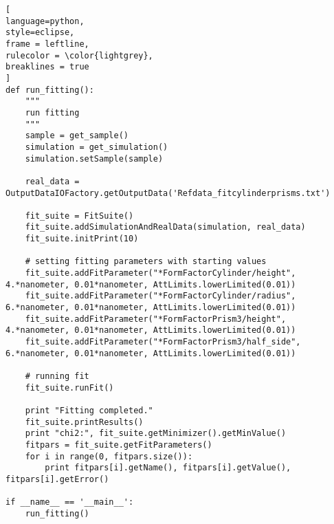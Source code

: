 \begin{lstlisting}[
language=python, 
style=eclipse, 
frame = leftline, 
rulecolor = \color{lightgrey},
breaklines = true
]
def run_fitting():
    """
    run fitting
    """
    sample = get_sample()
    simulation = get_simulation()
    simulation.setSample(sample)

    real_data = OutputDataIOFactory.getOutputData('Refdata_fitcylinderprisms.txt')
    
    fit_suite = FitSuite()
    fit_suite.addSimulationAndRealData(simulation, real_data)
    fit_suite.initPrint(10)

    # setting fitting parameters with starting values
    fit_suite.addFitParameter("*FormFactorCylinder/height", 4.*nanometer, 0.01*nanometer, AttLimits.lowerLimited(0.01))
    fit_suite.addFitParameter("*FormFactorCylinder/radius", 6.*nanometer, 0.01*nanometer, AttLimits.lowerLimited(0.01))
    fit_suite.addFitParameter("*FormFactorPrism3/height", 4.*nanometer, 0.01*nanometer, AttLimits.lowerLimited(0.01))
    fit_suite.addFitParameter("*FormFactorPrism3/half_side", 6.*nanometer, 0.01*nanometer, AttLimits.lowerLimited(0.01))

    # running fit
    fit_suite.runFit()
    
    print "Fitting completed."
    fit_suite.printResults()
    print "chi2:", fit_suite.getMinimizer().getMinValue()
    fitpars = fit_suite.getFitParameters()
    for i in range(0, fitpars.size()):
        print fitpars[i].getName(), fitpars[i].getValue(), fitpars[i].getError()

if __name__ == '__main__':
    run_fitting()
\end{lstlisting}

